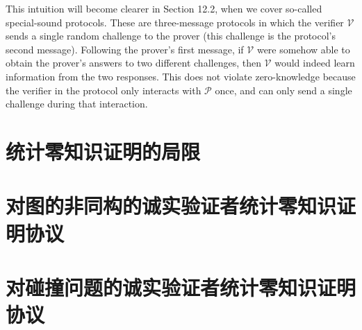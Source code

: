 This intuition will become clearer in Section 12.2, when we cover so-called special-sound protocols. These are three-message protocols in which the verifier $\mathcal{V}$ sends a single random challenge to the prover (this challenge is the protocol's second message). Following the prover's first message, if $\mathcal{V}$ were somehow able to obtain the prover's answers to two different challenges, then $\mathcal{V}$ would indeed learn information from the two responses. This does not violate zero-knowledge because the verifier in the protocol only interacts with $\mathcal{P}$ once, and can only send a single challenge during that interaction.



\section{统计零知识证明的局限}\label{11.2}
\section{对图的非同构的诚实验证者统计零知识证明协议}\label{11.3}
\section{对碰撞问题的诚实验证者统计零知识证明协议}\label{11.4}